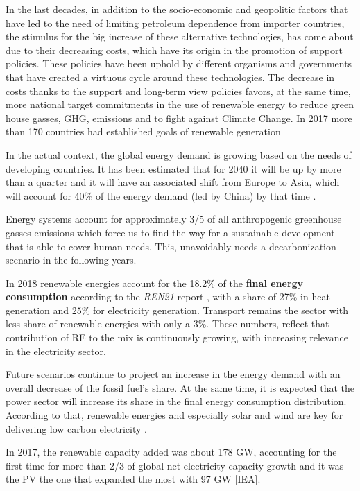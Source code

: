 In the last decades, in addition to the socio-economic and geopolitic factors that have led to the need of limiting petroleum dependence from importer countries, the stimulus for the big increase of these alternative technologies, has come about due to their decreasing costs, which have its origin in the promotion of support policies. These policies have been uphold by different organisms and governments that have created a virtuous cycle around these technologies. The decrease in costs thanks to the support and long-term view policies favors, at the same time, more national target commitments in the use of renewable energy to reduce green house gasses, GHG, emissions and to fight against Climate Change. In 2017 more than 170 countries had established goals of renewable generation \cite*{IRENA2017}
 
In the actual context, the global energy demand is growing based on the needs of developing countries. It has been estimated that for 2040 it will be up by more than a quarter and it will have an associated shift from Europe to Asia, which will account for 40$\%$ of the energy demand (led by China) by that time \cite*{WEO2018}.

Energy systems account for approximately 3/5 of all anthropogenic greenhouse gasses emissions \cite*{WEO2018} which force us to find the way for a sustainable development that is able to cover human needs. This, unavoidably needs a decarbonization scenario in the following years.  

In 2018 renewable energies account for the 18.2$\%$ of the \textbf{final energy consumption} according to the \textit{REN21} report \cite*{REN21}, with a share of 27$\%$ in heat generation and $25\%$ for electricity generation. Transport remains the sector with less share of renewable energies with only a $3\%$. These numbers, reflect that contribution of RE to the mix is continuously growing, with increasing relevance in the electricity sector.

Future scenarios continue to project an increase in the energy demand with an overall decrease of the fossil fuel's share. At the same time, it is expected that the power sector will increase its share in the final energy consumption distribution. According to that, renewable energies and especially solar and wind are key for delivering low carbon electricity \cite*{Troccoli2018}.

In 2017, the renewable capacity added was about 178 GW, accounting for the first time for more than 2/3 of global net electricity capacity growth and it was the PV the one that expanded the most with 97 GW [IEA].

